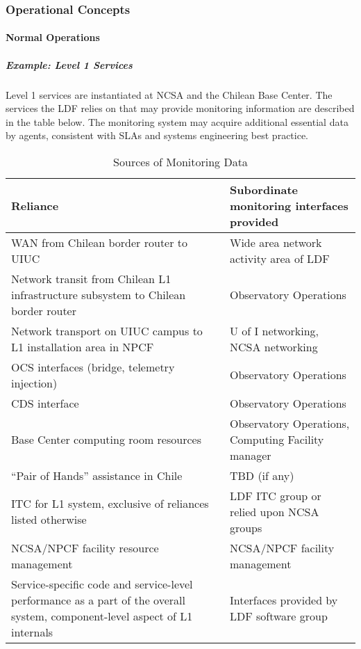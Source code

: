 \subsubsection{Operational Concepts}

\paragraph{Normal Operations}

\subparagraph{Example: Level 1 Services} 

Level 1 services are instantiated at NCSA and the Chilean Base Center. The 
services the LDF relies on that may provide monitoring information are described 
in the table below. The monitoring system may acquire additional essential data 
by agents, consistent with SLAs and systems engineering best practice.

\begin{longtable}{|p{}|p{}|}
\caption{Sources of Monitoring Data} \\\hline
\textbf{Reliance} & \textbf{Subordinate monitoring interfaces provided} \\\hline
WAN from Chilean border router to UIUC & Wide area network activity area of LDF \\\hline
Network transit from Chilean L1 infrastructure subsystem to Chilean border router & Observatory Operations \\\hline
Network transport on UIUC campus to L1 installation area in NPCF & U of I networking, NCSA networking \\\hline
OCS interfaces (bridge, telemetry injection) & Observatory Operations \\\hline
CDS interface & Observatory Operations \\\hline
Base Center computing room resources & Observatory Operations, Computing Facility manager \\\hline
``Pair of Hands'' assistance in Chile & TBD (if any) \\\hline
ITC for L1 system, exclusive of reliances listed otherwise & LDF ITC group or relied upon NCSA groups \\\hline
NCSA/NPCF facility resource management & NCSA/NPCF facility management \\\hline
Service-specific code and service-level performance as a part of the overall system, component-level aspect of L1 internals & Interfaces provided by LDF software group \\\hline
\end{longtable}

